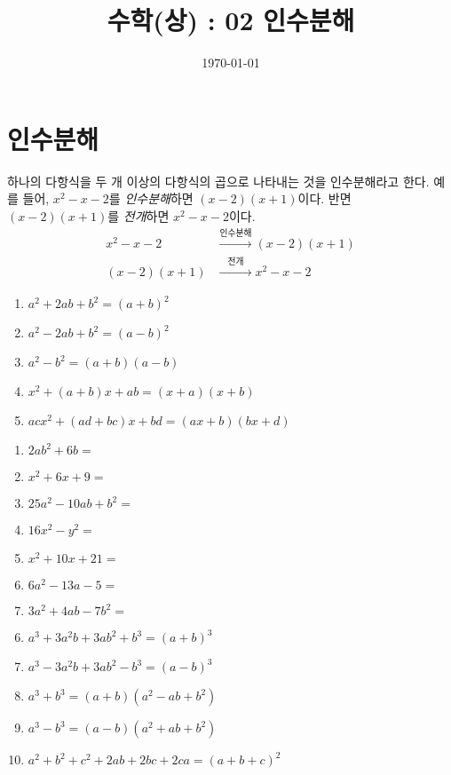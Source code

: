 \documentclass{oblivoir}
\begin{document}
\title{수학(상) : 02 인수분해}
\author{}
\date{\today}
\maketitle
\tableofcontents
\newpage

\section{인수분해}

%
\exam{}
하나의 다항식을 두 개 이상의 다항식의 곱으로 나타내는 것을 인수분해라고 한다.
예를 들어, \(x^2-x-2\)를 \emph{인수분해}하면 \((x-2)(x+1)\)이다.
반면 \((x-2)(x+1)\)를 \emph{전개}하면 \(x^2-x-2\)이다.
\begin{align*}
x^2-x-2&\xrightarrow{인수분해}(x-2)(x+1)\\
(x-2)(x+1)&\xrightarrow{\phantom{인}전개\phantom{인}}x^2-x-2
\end{align*}


%
\begin{mdframed}
\begin{enumerate}[(1)]
\item
\(a^2+2ab+b^2=(a+b)^2\)
\item
\(a^2-2ab+b^2=(a-b)^2\)
\item
\(a^2-b^2=(a+b)(a-b)\)
\item
\(x^2+(a+b)x+ab=(x+a)(x+b)\)
\item
\(acx^2+(ad+bc)x+bd=(ax+b)(bx+d)\)
\end{enumerate}
\end{mdframed}

%
\begin{enumerate}[(1)]
\item
\(2ab^2+6b=\)
\item
\(x^2+6x+9=\)
\item
\(25a^2-10ab+b^2=\)
\item
\(16x^2-y^2=\)
\item
\(x^2+10x+21=\)
\item
\(6a^2-13a-5=\)
\item
\(3a^2+4ab-7b^2=\)
\end{enumerate}

\newpage
%
\begin{mdframed}
\begin{enumerate}[(1)]
\setcounter{enumi}{5}
\item
\(a^3+3a^2b+3ab^2+b^3=(a+b)^3\)
\item
\(a^3-3a^2b+3ab^2-b^3=(a-b)^3\)
\item
\(a^3+b^3=(a+b)(a^2-ab+b^2)\)
\item
\(a^3-b^3=(a-b)(a^2+ab+b^2)\)
\item
\(a^2+b^2+c^2+2ab+2bc+2ca=(a+b+c)^2\)
\end{enumerate}
\end{mdframed}
\end{document}
